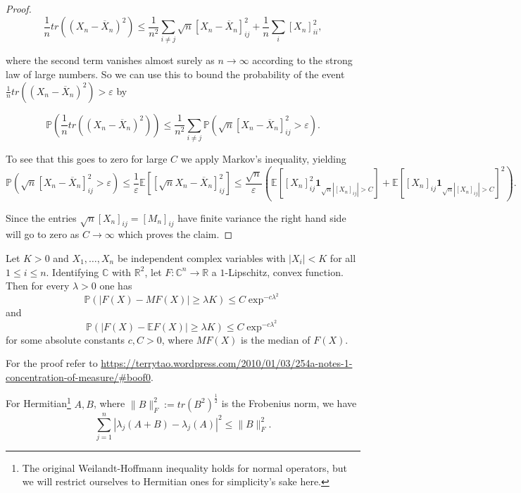 \begin{proof}
	$$\frac{1}{n}tr\left((X_n-\overline X_n)^2\right) \leq
	\frac{1}{n^2}\sum_{i\neq j}\sqrt n\left[X_n-\overline X_n\right]_{ij}^2+\frac{1}{n}\sum_i [X_n]_{ii}^2,$$
	
	where the second term vanishes almost surely as $n\rightarrow\infty$ according to the strong law of large numbers. So we can use this to bound the probability of the event $\frac{1}{n}tr\left((X_n-\overline X_n)^2\right)>\varepsilon$ by
	
	$$
	\mathbb P\left(\frac{1}{n}tr\left((X_n-\overline X_n)^2\right)\right)\leq
	\frac{1}{n^2}\sum_{i\neq j}\mathbb P\left(\sqrt n[X_n-\overline X_n]_{ij}^2>\varepsilon\right).
	$$
	
	To see that this goes to zero for large $C$ we apply Markov's inequality, yielding $$\mathbb P(\sqrt n[X_n-\overline X_n]_{ij}^2>\varepsilon)\leq
	\frac{1}{\varepsilon}\mathbb E\left[[\sqrt n X_n-\overline X_n]_{ij}^2\right]\leq
	\frac{\sqrt n}{\varepsilon}\left(\mathbb E[[X_n]_{ij}^2\mathbf 1_{\sqrt n |[X_n]_{ij}|>C}]+\mathbb E[[X_n]_{ij}\mathbf 1_{\sqrt n |[X_n]_{ij}|>C}]^2\right).$$
	
	Since the entries $\sqrt n [X_n]_{ij}=[M_n]_{ij}$ have finite variance the right hand side will go to zero as $C\rightarrow\infty$ which proves the claim.
\end{proof}

\begin{theorem}
	Let $K>0$ and $X_1,\dots,X_n$ be independent complex variables with $|X_i|<K$ for all $1\leq i\leq n$. Identifying $\mathbb C$ with $\mathbb R^2$, let $F:\mathbb C^n\rightarrow\mathbb R$ a $1$-Lipschitz, convex function. Then for every $\lambda>0$ one has
	$$\mathbb P(|F(X)-MF(X)|\geq \lambda K)\leq C\exp^{-c\lambda^2}$$ and $$\mathbb P(|F(X)-\mathbb EF(X)|\geq \lambda K)\leq C\exp^{-c\lambda^2}$$
	for some absolute constants $c,C>0$, where $MF(X)$ is the median of $F(X)$.
\end{theorem}
For the proof refer to \url{https://terrytao.wordpress.com/2010/01/03/254a-notes-1-concentration-of-measure/#boof0}.

\begin{theorem}
	For Hermitian\footnote{The original Weilandt-Hoffmann inequality holds for normal operators, but we will restrict ourselves to Hermitian ones for simplicity's sake here.} $A,B$, where $\|B\|_F^2:=tr(B^2)^{\frac{1}{2}}$ is the Frobenius norm, we have
	$$\sum_{j=1}^n|\lambda_j(A+B)-\lambda_j(A)|^2\leq\|B\|_F^2.$$
\end{theorem}

